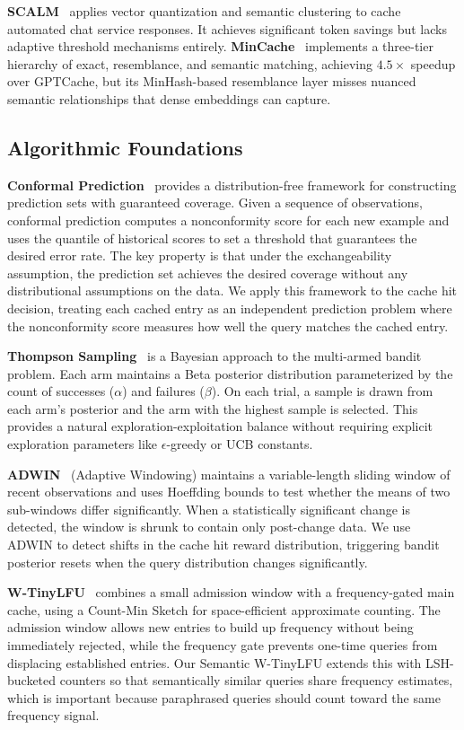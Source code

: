 \documentclass[conference]{IEEEtran}
\begin{document}
\textbf{SCALM}~\cite{li2024scalm} applies vector quantization and semantic clustering to cache automated chat service responses. It achieves significant token savings but lacks adaptive threshold mechanisms entirely. \textbf{MinCache}~\cite{haqiq2025} implements a three-tier hierarchy of exact, resemblance, and semantic matching, achieving $4.5\times$ speedup over GPTCache, but its MinHash-based resemblance layer misses nuanced semantic relationships that dense embeddings can capture.

\subsection{Algorithmic Foundations}

\textbf{Conformal Prediction}~\cite{vovk2005} provides a distribution-free framework for constructing prediction sets with guaranteed coverage. Given a sequence of observations, conformal prediction computes a nonconformity score for each new example and uses the quantile of historical scores to set a threshold that guarantees the desired error rate. The key property is that under the exchangeability assumption, the prediction set achieves the desired coverage without any distributional assumptions on the data. We apply this framework to the cache hit decision, treating each cached entry as an independent prediction problem where the nonconformity score measures how well the query matches the cached entry.

\textbf{Thompson Sampling}~\cite{thompson1933} is a Bayesian approach to the multi-armed bandit problem. Each arm maintains a Beta posterior distribution parameterized by the count of successes ($\alpha$) and failures ($\beta$). On each trial, a sample is drawn from each arm's posterior and the arm with the highest sample is selected. This provides a natural exploration-exploitation balance without requiring explicit exploration parameters like $\epsilon$-greedy or UCB constants.

\textbf{ADWIN}~\cite{bifet2007} (Adaptive Windowing) maintains a variable-length sliding window of recent observations and uses Hoeffding bounds to test whether the means of two sub-windows differ significantly. When a statistically significant change is detected, the window is shrunk to contain only post-change data. We use ADWIN to detect shifts in the cache hit reward distribution, triggering bandit posterior resets when the query distribution changes significantly.

\textbf{W-TinyLFU}~\cite{einziger2017} combines a small admission window with a frequency-gated main cache, using a Count-Min Sketch for space-efficient approximate counting. The admission window allows new entries to build up frequency without being immediately rejected, while the frequency gate prevents one-time queries from displacing established entries. Our Semantic W-TinyLFU extends this with LSH-bucketed counters so that semantically similar queries share frequency estimates, which is important because paraphrased queries should count toward the same frequency signal.
\end{document}
